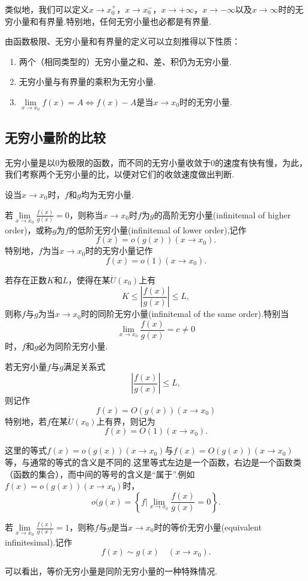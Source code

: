 类似地，我们可以定义$x\to x_0^+$，$x\to x_0^-$，$x\to +\infty$，$x\to -\infty$以及$x\to \infty$时的无穷小量和有界量.特别地，任何无穷小量也必都是有界量.

由函数极限、无穷小量和有界量的定义可以立刻推得以下性质：
\begin{enumerate}
	\item 两个（相同类型的）无穷小量之和、差、积仍为无穷小量.
	\item 无穷小量与有界量的乘积为无穷小量.
	\item $\lim\limits_{x\to x_0}f(x)=A\iff f(x)-A$是当$x\to x_0$时的无穷小量.
\end{enumerate}
\subsection{无穷小量阶的比较}
无穷小量是以$0$为极限的函数，而不同的无穷小量收敛于$0$的速度有快有慢，为此，我们考察两个无穷小量的比，以便对它们的收敛速度做出判断.

设当$x\to x_0$时，$f$和$g$均为无穷小量.
\begin{definition}[不同阶无穷小量]
	若$\lim\limits_{x\to x_0}\frac{f(x)}{g(x)}=0$，则称当$x\to x_0$时$f$为$g$的{\heiti 高阶无穷小量}(infinitemal of higher order)，或称$g$为$f$的{\heiti 低阶无穷小量}(infinitemal of lower order),记作
	$$f(x)=o(g(x))(x\to x_0).$$
	特别地，$f$为当$x\to x_0$时的无穷小量记作
	$$f(x)=o(1)(x\to x_0).$$
\end{definition}
\begin{definition}[同阶无穷小量]
	若存在正数$K$和$L$，使得在某$\mathring{U}(x_0)$上有
	$$K\leqslant\left|\frac{f(x)}{g(x)}\right|\leqslant L,$$
	则称$f$与$g$为当$x\to x_0$时的{\heiti 同阶无穷小量}(infinitemal of the same order).特别当
	$$\lim\limits_{x\to x_0}\frac{f(x)}{g(x)}=c\neq 0$$
	时，$f$和$g$必为同阶无穷小量.
	
	若无穷小量$f$与$g$满足关系式
	$$\left|\frac{f(x)}{g(x)}\right|\leqslant L,$$
	则记作
	$$f(x)=O(g(x))(x\to x_0)$$
	特别地，若$f$在某$\mathring{U}(x_0)$上有界，则记为
	$$f(x)=O(1)(x\to x_0).$$
\end{definition}
\begin{remark}
	这里的等式$f(x)=o(g(x))(x\to x_0)$与$f(x)=O(g(x))(x\to x_0)$等，与通常的等式的含义是不同的.这里等式左边是一个函数，右边是一个函数类（函数的集合），而中间的等号的含义是“属于”.例如$f(x)=o(g(x))(x\to x_0)$时，
	$$o(g(x)=\left\{f\big|\lim\limits_{x\to x_0}\frac{f(x)}{g(x)}=0\right\}.$$
\end{remark}
\begin{definition}[等价无穷小量]
	若$\lim\limits_{x\to x_0}\frac{f(x)}{g(x)}=1$，则称$f$与$g$是当$x\to x_0$时的{\heiti 等价无穷小量}(equivalent infinitesimal).记作
	$$f(x)\sim g(x)\quad (x\to x_0).$$
\end{definition}
可以看出，等价无穷小量是同阶无穷小量的一种特殊情况.

